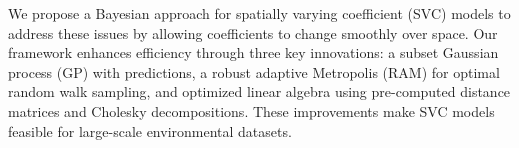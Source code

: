 We propose a Bayesian approach for spatially varying coefficient (SVC) models to address these issues by allowing coefficients to change smoothly over space. Our framework enhances efficiency through three key innovations: a subset Gaussian process (GP) with predictions, a robust adaptive Metropolis (RAM) for optimal random walk sampling, and optimized linear algebra using pre-computed distance matrices and Cholesky decompositions. These improvements make SVC models feasible for large-scale environmental datasets.

% 
% 
